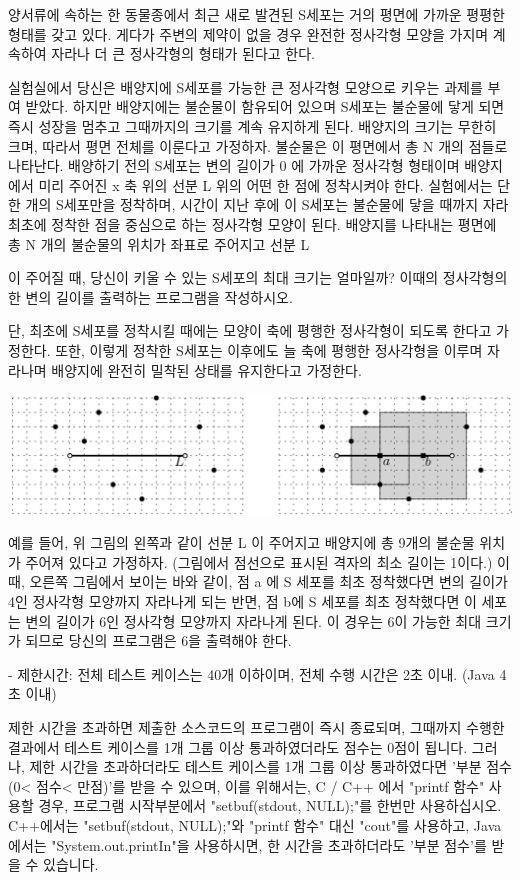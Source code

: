\documentclass [12pt] {oblivoir}
\begin{document}
양서류에 속하는 한 동물종에서 최근 새로 발견된 S세포는 거의 평면에 가까운 평평한 형태를 갖고 있다.
게다가 주변의 제약이 없을 경우 완전한 정사각형 모양을 가지며 계속하여 자라나 더 큰 정사각형의 형태가 된다고 한다.

실험실에서 당신은 배양지에 S세포를 가능한 큰 정사각형 모양으로 키우는 과제를 부여 받았다.
하지만 배양지에는 불순물이 함유되어 있으며 S세포는 불순물에 닿게 되면 즉시 성장을 멈추고 그때까지의 크기를 계속 유지하게 된다.
배양지의 크기는 무한히 크며, 따라서 평면 전체를 이룬다고 가정하자.
불순물은 이 평면에서 총 N 개의 점들로 나타난다.
배양하기 전의 S세포는 변의 길이가 0 에 가까운 정사각형 형태이며 배양지에서 미리 주어진 x 축 위의 선분 L 위의 어떤 한 점에 정착시켜야 한다.
실험에서는 단 한 개의 S세포만을 정착하며, 시간이 지난 후에 이 S세포는 불순물에 닿을 때까지 자라 최초에 정착한 점을 중심으로 하는 정사각형 모양이 된다.
배양지를 나타내는 평면에 총 N 개의 불순물의 위치가 좌표로 주어지고 선분 L

이 주어질 때, 당신이 키울 수 있는 S세포의 최대 크기는 얼마일까?
이때의 정사각형의 한 변의 길이를 출력하는 프로그램을 작성하시오.

단, 최초에 S세포를 정착시킬 때에는 모양이 축에 평행한 정사각형이 되도록 한다고 가정한다.
또한, 이렇게 정착한 S세포는 이후에도 늘 축에 평행한 정사각형을 이루며 자라나며 배양지에 완전히 밀착된 상태를 유지한다고 가정한다.

\includegraphics[scale=0.5]{n5.png}

예를 들어,  위 그림의 왼쪽과 같이 선분 L 이 주어지고 배양지에 총 9개의 불순물 위치가 주어져 있다고 가정하자. (그림에서 점선으로 표시된 격자의 최소 길이는 1이다.)
이 때, 오른쪽 그림에서 보이는 바와 같이, 점 a 에 S 세포를 최초 정착했다면 변의 길이가 4인 정사각형 모양까지 자라나게 되는 반면, 점 b에 S 세포를 최초 정착했다면 이 세포는 변의 길이가 6인 정사각형 모양까지 자라나게 된다.
이 경우는 6이 가능한 최대 크기가 되므로 당신의 프로그램은 6을 출력해야 한다.


- 제한시간: 전체 테스트 케이스는 40개 이하이며, 전체 수행 시간은 2초 이내. (Java 4초 이내)

제한 시간을 초과하면 제출한 소스코드의 프로그램이 즉시 종료되며,
그때까지 수행한 결과에서 테스트 케이스를 1개 그룹 이상 통과하였더라도 점수는 0점이 됩니다.
그러나, 제한 시간을 초과하더라도 테스트 케이스를 1개 그룹 이상 통과하였다면 '부분 점수(0< 점수< 만점)'를 받을 수 있으며,
이를 위해서는, C / C++ 에서 "printf 함수" 사용할 경우, 프로그램 시작부분에서 "setbuf(stdout, NULL);"를 한번만 사용하십시오.
C++에서는 "setbuf(stdout, NULL);"와 "printf 함수" 대신 "cout"를 사용하고, Java에서는 "System.out.printIn"을 사용하시면,
한 시간을 초과하더라도 '부분 점수'를 받을 수 있습니다.
\end{document}

